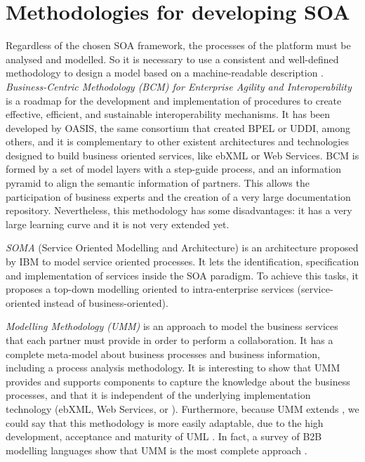 \section{Methodologies for developing SOA}
\label{chap:soa:methodologies}
Regardless of the chosen SOA framework, the processes %
 of the platform must be analysed and modelled. So it is necessary to use a consistent and well-defined methodology to design a model based on a machine-readable description \cite{Garcia09UMM}. {\em Business-Centric Methodology (BCM) for Enterprise Agility and Interoperability} \cite{Oasis03BCM} is a roadmap for the development and implementation of procedures to create effective, efficient, and sustainable interoperability mechanisms. It has been developed by OASIS, the same consortium that created BPEL or UDDI, among others, and it is complementary to other existent architectures and technologies designed to build business oriented services, like ebXML or Web Services. BCM is formed by a set of model layers with a step-guide process, and an information pyramid to align the semantic information of partners. This allows the participation of business experts and the creation of a very large documentation repository. Nevertheless, this methodology has some disadvantages: it has a very large learning curve and it is not very extended yet. 

{\em SOMA} (Service Oriented Modelling and Architecture)
\cite{Arsanjani2008SOMA} is an architecture proposed by IBM to model
service oriented processes. It lets the identification, specification
and implementation of services inside the SOA paradigm. To achieve
this tasks, it proposes a top-down modelling oriented to
intra-enterprise services (service-oriented instead of
business-oriented). %

{\em {} Modelling Methodology (UMM)}
\cite{Hofreiter06UMM} is an approach to model the business services
that each partner must provide in order to perform a
 collaboration. It has a
complete meta-model about business processes and business information,
including a process analysis methodology. It is interesting to show
that UMM provides and supports components to capture the knowledge
about the business processes, and that it is independent of the
underlying implementation technology (ebXML, Web Services,
 or
). Furthermore, because
UMM extends , we could
say that this methodology is more easily adaptable, due to the high
development, acceptance and maturity of UML \cite{Garcia09UMM}. In
fact, a survey of B2B modelling languages show that UMM is the most
complete approach \cite{Folmer08b2b}. 






